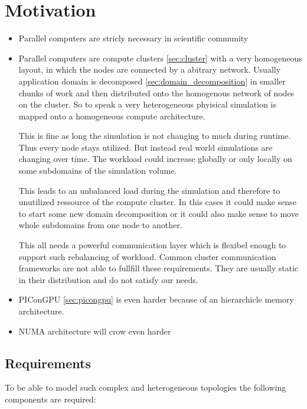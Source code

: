 \section{Motivation}
\begin{itemize}
\item Parallel computers are stricly necessary in scientific community
\item Parallel computers are compute clusters
  \ref{sec:cluster} with a very homogeneous layout, in which the nodes
  are connected by a abitrary network.  Usually application domain is
  decomposed \ref{sec:domain_decomposition} in smaller chunks
  of work and then distributed onto the homogenous network of nodes on
  the cluster.  So to speak a very heterogeneous phyisical simulation
  is mapped onto a homogeneous compute architecture.

  This is fine as long the simulation is not changing to much during
  runtime. Thus every node stays utilized. But instead real world
  simulations are changing over time. The workload could increase
  globally or only locally on some subdomains of the simulation
  volume.

  This leads to an unbalanced load during the simulation and therefore
  to unutilized ressource of the compute cluster. In this cases it
  could make sense to start some new domain decomposition or it could
  also make sense to move whole subdomains from one node to another.

  This all needs a powerful communication layer which is flexibel
  enough to support such rebalancing of workload. Common cluster
  communication frameworks are not able to fullfill these
  requirements. They are usually static in their distribution and do
  not satisfy our needs.


\item PIConGPU \ref{sec:picongpu} is even harder because of an
  hierarchicle memory architecture.
\item NUMA architecture will crow even harder
\end{itemize}

\subsection{Requirements}
To be able to model such complex and heterogeneous topologies the
following components are required:

